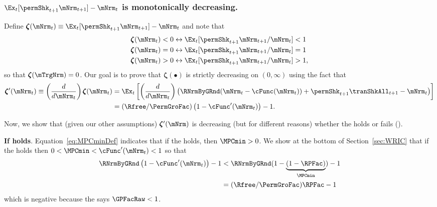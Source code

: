 \documentclass[\econtexRoot/BufferStockTheory]{subfiles}
\begin{document}
\subsubsection{\texorpdfstring{$\Ex_{t}[\permShk_{t+1}\mNrm_{t+1}] -\mNrm_t$}{PermShk m{t+1} --- m{t}} is monotonically decreasing.}

Define \providecommand{\difFunc}{\pmb{\zeta}} $\difFunc(\mNrm_t) \equiv 
\Ex_t[\permShk_{t+1}\mNrm_{t+1}] - \mNrm_t$ and note that
\begin{align}\label{eq:difLvlEquiv}
  \difFunc(\mNrm_t) < 0 &\leftrightarrow \Ex_t[\permShk_{t+1}\mNrm_{t+1}/\mNrm_{t}] < 1 
                          \nonumber\\
  \difFunc(\mNrm_t) = 0 &\leftrightarrow \Ex_t[\permShk_{t+1}\mNrm_{t+1}/\mNrm_{t}] = 1\\
  \difFunc(\mNrm_t) > 0 &\leftrightarrow \Ex_t[\permShk_{t+1}\mNrm_{t+1}/\mNrm_{t}] > 
                          1,\nonumber
\end{align}
so that $\difFunc(\mTrgNrm)=0$. Our goal is to prove that $\difFunc(\bullet)$ is strictly 
decreasing on $(0,\infty)$ using the fact that
\begin{align}
  \difFunc^{\prime}(\mNrm_{t}) \equiv  \left( \frac{d}{d\mNrm_{t}}\right) \difFunc(\mNrm_t)  & = \Ex_{t}\left[
                                                                                               \left( \frac{d}{d\mNrm_{t}}\right) \left( 
                                                                                               {\RNrmByGRnd}(\mNrm_{t}-\cFunc(\mNrm_{t}))+%
                                                                                               {\permShk}_{t+1}{\tranShkAll}_{t+1} - {\mNrm}_t\right) \right] \label{eq:difFuncDecreases} \\
                                                                                             & = (\Rfree/\PermGroFac)\left(1-\cFunc^{\prime}({\mNrm}_t)\right) - 1.  \notag
\end{align}

Now, we show that (given our other assumptions) $\difFunc^{\prime}(\mNrm)$ is decreasing (but for different reasons) whether the {\RIC} holds or fails (\cncl{\RIC}).

\textbf{If {\RIC} holds}. Equation~\eqref{eq:MPCminDef} indicates that if the {\RIC} holds, then $\MPCmin >0$.  We show at the bottom of Section~\ref{sec:WRIC} that if the {\RIC} holds then $0 < \MPCmin < \cFunc^{\prime}(\mNrm_{t}) < 1$ so that 
\begin{align*}
  \RNrmByGRnd\left(1-\cFunc^{\prime}({\mNrm}_t)\right) - 1 & <  \RNrmByGRnd(1-\underbrace{(1-\RPFac)}_{\MPCmin}) - 1  \\
                                                      & = (\Rfree/\PermGroFac)\RPFac - 1 
\end{align*}
which is negative because the {\GICRaw} says $\GPFacRaw < 1$.  
\end{document}
